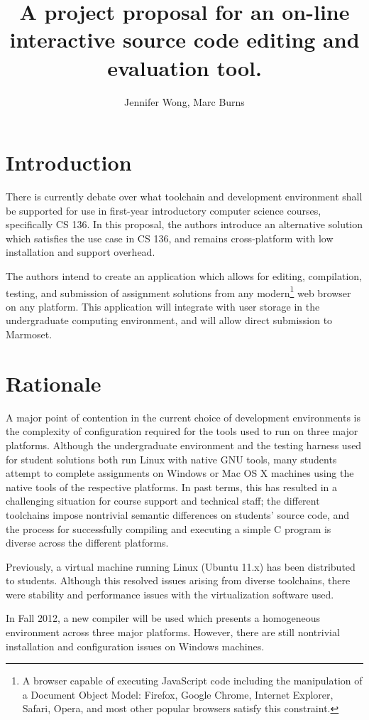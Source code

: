 \documentclass[12pt]{paper}
\title{A project proposal for an on-line interactive source code editing and evaluation tool.}
\author{Jennifer Wong, Marc Burns}
\begin{document}
	\maketitle
	\section{Introduction}
	There is currently debate over what toolchain and development environment shall be supported
	for use in first-year introductory computer science courses, specifically CS 136. In this proposal,
	the authors introduce an alternative solution which satisfies the use case in CS 136, and remains cross-platform
	with low installation and support overhead.

	The authors intend to create an application which allows for editing, compilation, testing, and submission of
	assignment solutions from any modern\footnote{A browser capable of executing JavaScript code including the manipulation
  of a Document Object Model: Firefox, Google Chrome, Internet Explorer, Safari, Opera, and most other popular browsers
  satisfy this constraint.} web browser on any platform. This application will integrate with
	user storage in the undergraduate computing environment, and will allow direct submission to Marmoset.
	
	\section{Rationale}
	A major point of contention in the current choice of development environments is the complexity of configuration
	required for the tools used to run on three major platforms. Although the undergraduate environment and the testing
	harness used for student solutions both run Linux with native GNU tools, many students attempt to complete assignments
	on Windows or Mac OS X machines using the native tools of the respective platforms. In past terms, this has resulted
	in a challenging situation for course support and technical staff; the different toolchains impose nontrivial semantic
	differences on students' source code, and the process for successfully compiling and executing a simple C program
	is diverse across the different platforms.

	Previously, a virtual machine running Linux (Ubuntu 11.x) has been distributed to students. Although this resolved
	issues arising from diverse toolchains, there were stability and performance issues with the virtualization software
	used.

	In Fall 2012, a new compiler will be used which presents a homogeneous environment across three major platforms.
	However, there are still nontrivial installation and configuration issues on Windows machines.
\end{document}
